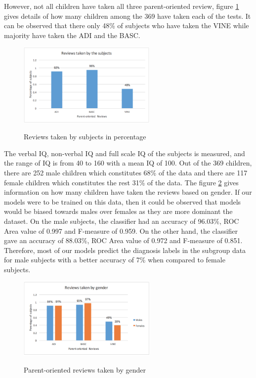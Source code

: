 However, not all children have taken all three parent-oriented review, figure \ref{fig:Reviews} gives details of how many children among the 369 have taken each of the tests. It can be observed that there only 48\% of subjects who have taken the VINE while majority have taken the ADI and the BASC.

\begin{figure}
\centering
  {\includegraphics[width=0.6\textwidth]{Figures/Figure_3_2.png}}
  \caption{Reviews taken by subjects in percentage}
  \label{fig:Reviews}
\end{figure}
The verbal IQ, non-verbal IQ and full scale IQ of the subjects is measured, and the range of IQ is from 40 to 160 with a mean IQ of 100. Out of the 369 children, there are 252 male children which constitutes 68\% of the data and there are 117 female children which constitutes the rest 31\% of the data. The figure \ref{fig:Reviews2} gives information on how many children have taken the reviews based on gender. If our models were to be trained on this data, then it could be observed that models would be biased towards males over females as they are more dominant the dataset. On the male subjects, the classifier had an accuracy of 96.03\%, ROC Area value of 0.997 and F-measure of 0.959. On the other hand, the classifier gave an accuracy of 88.03\%, ROC Area value of 0.972 and F-measure of 0.851. Therefore, most of our models predict the diagnosis labels in the subgroup data for male subjects with a better accuracy of 7\% when compared to female subjects.
\begin{figure}
\centering
  {\includegraphics[width=0.6\textwidth]{Figures/Figure_3_3.png}}
  \caption{ Parent-oriented reviews taken by gender}
  \label{fig:Reviews2}
\end{figure}


